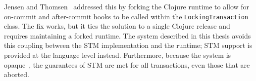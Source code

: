 Jensen and Thomsen~\cite{jensen2016} addressed this by forking the
Clojure runtime to allow for on-commit and after-commit hooks to be
called within the \texttt{LockingTransaction} class. The fix works, but
it ties the solution to a single Clojure release and requires maintaining
a forked runtime. The system described in this thesis
avoids this coupling between the STM implementation and the runtime;
STM support is provided at the language level instead. Furthermore,
because the system is opaque~\cite{guerraoui2007}, the guarantees of STM
are met for all transactions, even those that are aborted.
